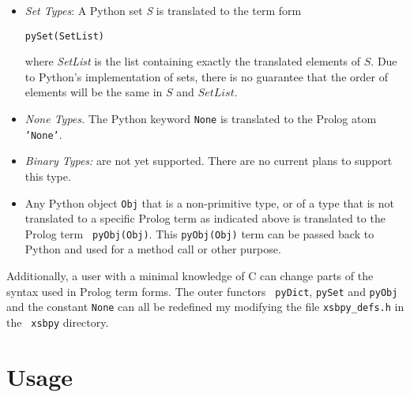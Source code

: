 \begin{itemize}
         {\tt ''(Key,Value)}

         {\tt Key} and {\tt Value} are the translations of any Python
         data structures that are both allowable as a dictionary key
         or value, and supported by {\tt xsbpy}.  For instance, {\tt
           Value} can be (the term form of) a list, a set, a tuple or
         another dictionary.

       \item {\em Set Types}: A Python set {\em S} is translated to
         the term form

         {\tt pySet(SetList)}

         where {\em SetList} is the list containing exactly the
         translated elements of $S$.  Due to Python's implementation
         of sets, there is no guarantee that the order of elements
         will be the same in $S$ and $SetList$.
       \item {\em None Types.} The Python keyword {\tt None} is
         translated to the Prolog atom {\tt 'None'}. 
       \item {\em Binary Types:} are not yet supported.  There are no
         current plans to support this type.
     \item Any Python object {\tt Obj} that is a non-primitive type,
       or of a type that is not translated to a specific Prolog term
       as indicated above is translated to the Prolog term {\tt
         pyObj(Obj)}.  This {\tt pyObj(Obj)} term can be passed back to
       Python and used for a method call or other purpose.
\end{itemize}

Additionally, a user with a minimal knowledge of C can change parts of
the syntax used in Prolog term forms.  The outer functors {\tt
  pyDict}, {\tt pySet} and {\tt pyObj} and the constant {\tt None} can
all be redefined my modifying the file {\tt xsbpy\_defs.h} in the {\tt
  xsbpy} directory.

\section{Usage}

